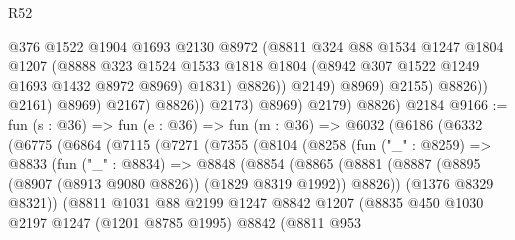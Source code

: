 \begin{lexlean}{R52}
\begin{coremodule}
                                  @376
                                  @1522
                                  @1904
                                  @1693
                                  @2130
                                  @8972
                                  (@8811
                                    @324
                                    @88
                                    @1534
                                    @1247
                                    @1804
                                    @1207
                                    (@8888
                                      @323
                                      @1524
                                      @1533
                                      @1818
                                      @1804
                                      (@8942 @307 @1522 @1249 @1693 @1432 @8972 @8969)
                                      @1831)
                                    @8826))
                                @2149)
                              @8969)
                            @2155)
                          @8826))
                      @2161)
                    @8969)
                  @2167)
                @8826))
            @2173)
          @8969)
        @2179)
      @8826)
    @2184
@9166 := fun (s : @36) =>
  fun (e : @36) =>
  fun (m : @36) =>
  @6032
    (@6186
      (@6332
        (@6775
          (@6864
            (@7115
              (@7271
                (@7355
                  (@8104
                    (@8258
                      (fun ("_" : @8259) =>
                      @8833
                        (fun ("_" : @8834) =>
                        @8848
                          (@8854
                            (@8865
                              (@8881
                                (@8887
                                  (@8895 (@8907 (@8913 @9080 @8826)) (@1829 @8319 @1992))
                                  @8826))
                              (@1376 @8329 @8321))
                            (@8811
                              @1031
                              @88
                              @2199
                              @1247
                              @8842
                              @1207
                              (@8835
                                @450
                                @1030
                                @2197
                                @1247
                                (@1201 @8785 @1995)
                                @8842
                                (@8811
                                  @953

\end{coremodule}
\end{lexlean}
